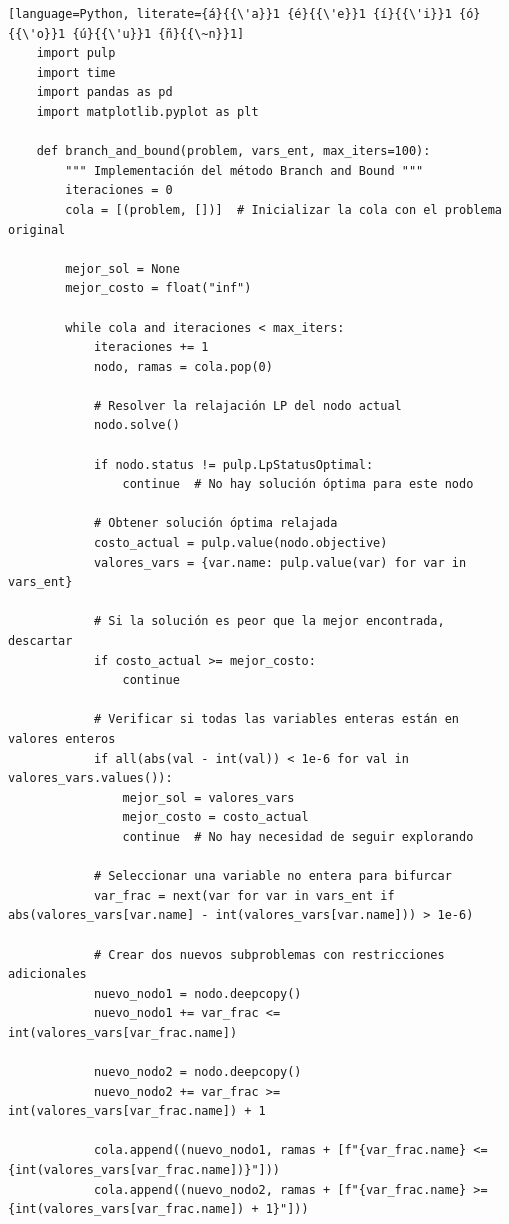 \documentclass{article}
\begin{document}
\begin{lstlisting}[language=Python, literate={á}{{\'a}}1 {é}{{\'e}}1 {í}{{\'i}}1 {ó}{{\'o}}1 {ú}{{\'u}}1 {ñ}{{\~n}}1]
    import pulp
    import time
    import pandas as pd
    import matplotlib.pyplot as plt
    
    def branch_and_bound(problem, vars_ent, max_iters=100):
        """ Implementación del método Branch and Bound """
        iteraciones = 0
        cola = [(problem, [])]  # Inicializar la cola con el problema original
    
        mejor_sol = None
        mejor_costo = float("inf")
    
        while cola and iteraciones < max_iters:
            iteraciones += 1
            nodo, ramas = cola.pop(0)
    
            # Resolver la relajación LP del nodo actual
            nodo.solve()
    
            if nodo.status != pulp.LpStatusOptimal:
                continue  # No hay solución óptima para este nodo
    
            # Obtener solución óptima relajada
            costo_actual = pulp.value(nodo.objective)
            valores_vars = {var.name: pulp.value(var) for var in vars_ent}
    
            # Si la solución es peor que la mejor encontrada, descartar
            if costo_actual >= mejor_costo:
                continue
    
            # Verificar si todas las variables enteras están en valores enteros
            if all(abs(val - int(val)) < 1e-6 for val in valores_vars.values()):
                mejor_sol = valores_vars
                mejor_costo = costo_actual
                continue  # No hay necesidad de seguir explorando
    
            # Seleccionar una variable no entera para bifurcar
            var_frac = next(var for var in vars_ent if abs(valores_vars[var.name] - int(valores_vars[var.name])) > 1e-6)
    
            # Crear dos nuevos subproblemas con restricciones adicionales
            nuevo_nodo1 = nodo.deepcopy()
            nuevo_nodo1 += var_frac <= int(valores_vars[var_frac.name])
    
            nuevo_nodo2 = nodo.deepcopy()
            nuevo_nodo2 += var_frac >= int(valores_vars[var_frac.name]) + 1
    
            cola.append((nuevo_nodo1, ramas + [f"{var_frac.name} <= {int(valores_vars[var_frac.name])}"]))
            cola.append((nuevo_nodo2, ramas + [f"{var_frac.name} >= {int(valores_vars[var_frac.name]) + 1}"]))
    

\end{lstlisting}
\end{document}
